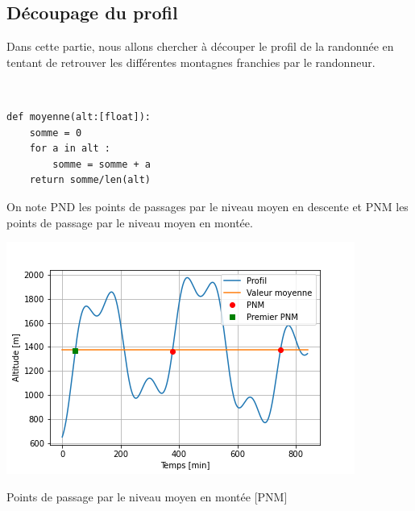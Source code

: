 


\subsection*{Découpage du profil}

\ifprof
\else
Dans cette partie, nous allons chercher à découper le profil de la randonnée en tentant de retrouver les différentes montagnes franchies par le randonneur.
\fi

\ifprof
\begin{corrige}~\\
\vspace{-.5cm}
\begin{lstlisting}
def moyenne(alt:[float]):
    somme = 0
    for a in alt : 
        somme = somme + a
    return somme/len(alt)
\end{lstlisting}
\end{corrige}
\else
\fi




\ifprof
\else
\fi

On note PND les points de passages par le niveau moyen en descente et PNM les points de passage par le niveau moyen en montée. 

\begin{marginfigure}
\includegraphics[width=\linewidth]{fig_03}
\caption{Points de passage par le niveau moyen en montée [PNM]}
\end{marginfigure}


